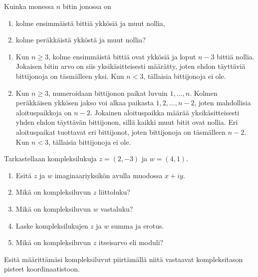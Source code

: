 \documentclass[11pt,a4paper]{amsart}
\begin{document}
\begin{exercise}
Kuinka monessa \(n\) bitin jonossa on
\begin{enumerate}[label=\alph*), nosep]
\item kolme ensimmäistä bittiä ykkösiä ja muut nollia,
\item kolme peräkkäistä ykköstä ja muut nollia?
\end{enumerate}
\end{exercise}

\begin{solution}
\leavevmode\par
\begin{enumerate}[label=\alph*), nosep]
\item Kun \(n \geq 3\), kolme ensimmäistä bittiä ovat ykkösiä ja loput
\(n - 3\) bittiä nollia. Jokaisen bitin arvo on siis yksikäsitteisesti
määrätty, joten ehdon täyttäviä bittijonoja on täsmälleen yksi.
Kun \(n < 3\), tällaisia bittijonoja ei ole.

\item Kun \(n \geq 3\), numeroidaan bittijonon paikat luvuin
\(1, \ldots, n\). Kolmen peräkkäisen ykkösen jakso voi alkaa
paikasta \(1, 2, \ldots, n - 2\), joten mahdollisia aloituspaikkoja
on \(n - 2\). Jokainen aloituspaikka määrää
yksikäsitteisesti yhden ehdon täyttävän bittijonon, sillä kaikki muut
bitit ovat nollia. Eri aloituspaikat tuottavat eri bittijonot, joten
bittijonoja on täsmälleen \(n - 2\). Kun \(n < 3\), tällaisia
bittijonoja ei ole.
\end{enumerate}
\end{solution}

\begin{exercise}
Tarkastellaan kompleksilukuja \(z = (2, -3)\) ja \(w = (4, 1)\).
\begin{enumerate}[label=\alph*), nosep]
\item Esitä \(z\) ja \(w\) imaginaariyksikön avulla muodossa \(x + iy\).
\item Mikä on kompleksiluvun \(z\) liittoluku?
\item Mikä on kompleksiluvun \(w\) vastaluku?
\item Laske kompleksilukujen \(z\) ja \(w\) summa ja erotus.
\item Mikä on kompleksiluvun \(z\) itseisarvo eli moduli?
\end{enumerate}
Esitä määrittämäsi kompleksiluvut piirtämällä niitä vastaavat
kompleksitason pisteet koordinaatistoon.
\end{exercise}
\end{document}
